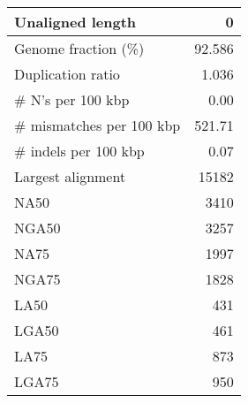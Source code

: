 \documentclass[12pt,a4paper]{article}
\begin{document}
\begin{table}[ht]
\begin{center}
\begin{tabular}{|l*{1}{|r}|}
Unaligned length & 0 \\ \hline
Genome fraction (\%) & 92.586 \\ \hline
Duplication ratio & 1.036 \\ \hline
\# N's per 100 kbp & 0.00 \\ \hline
\# mismatches per 100 kbp & 521.71 \\ \hline
\# indels per 100 kbp & 0.07 \\ \hline
Largest alignment & 15182 \\ \hline
NA50 & 3410 \\ \hline
NGA50 & 3257 \\ \hline
NA75 & 1997 \\ \hline
NGA75 & 1828 \\ \hline
LA50 & 431 \\ \hline
LGA50 & 461 \\ \hline
LA75 & 873 \\ \hline
LGA75 & 950 \\ \hline
\end{tabular}
\end{center}
\end{table}
\end{document}
